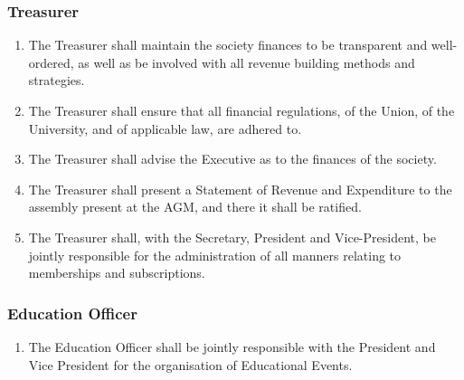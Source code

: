 \documentclass[parskip=half]{scrartcl}
\begin{document}
            \subsubsection{Treasurer}
                \label{executive--executive-positions--treasurer}
                \begin{enumerate}
                    \item The Treasurer shall maintain the society finances to be transparent and well-ordered, as well as be involved with all revenue building methods and strategies.
                    
                    \item The Treasurer shall ensure that all financial regulations, of the Union, of the University, and of applicable law, are adhered to.
                    
                    \item The Treasurer shall advise the Executive as to the finances of the society.
                    
                    \item The Treasurer shall present a Statement of Revenue and Expenditure to the assembly present at the AGM, and there it shall be ratified.
                    
                    \item The Treasurer shall, with the Secretary, President and Vice-President, be jointly responsible for the administration of all manners relating to memberships and subscriptions.
                \end{enumerate}
            
            \subsubsection{Education Officer}
                \label{executive--executive-positions--education-officer}
                \begin{enumerate}
                    \item The Education Officer shall be jointly responsible with the President and Vice President for the organisation of Educational Events.
                \end{enumerate}
            
\end{document}
